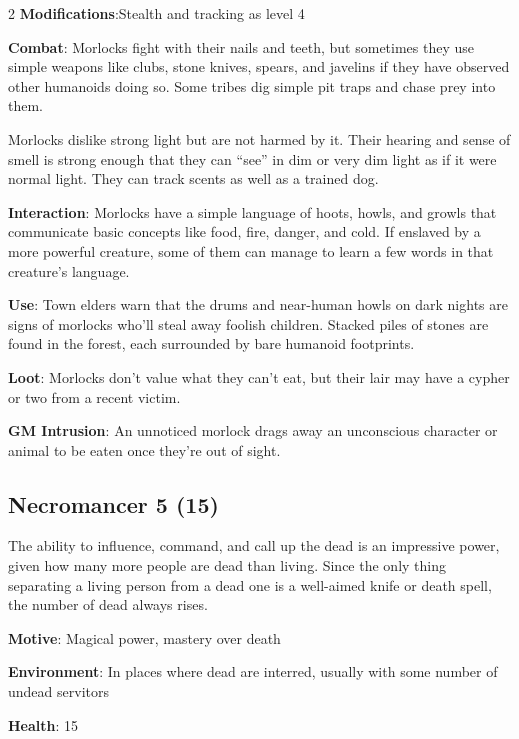 \begin{multicols}{2}
\textbf{Modifications}:Stealth and tracking as level 4 

\textbf{Combat}: Morlocks fight with their nails and teeth, but sometimes they use simple weapons like clubs, stone knives, spears, and javelins if they have observed other humanoids doing so. Some tribes dig simple pit traps and chase prey into them. 

Morlocks dislike strong light but are not harmed by it. Their hearing and sense of smell is strong enough that they can “see” in dim or very dim light as if it were normal light. They can track scents as well as a trained dog. 

\textbf{Interaction}: Morlocks have a simple language of hoots, howls, and growls that communicate basic concepts like food, fire, danger, and cold. If enslaved by a more powerful creature, some of them can manage to learn a few words in that creature’s language. 

\textbf{Use}: Town elders warn that the drums and near-human howls on dark nights are signs of morlocks who’ll steal away foolish children. Stacked piles of stones are found in the forest, each surrounded by bare humanoid footprints. 

\textbf{Loot}: Morlocks don’t value what they can’t eat, but their lair may have a cypher or two from a recent victim.

\textbf{GM Intrusion}: An unnoticed morlock drags away an unconscious character or animal to be eaten once they’re out of sight.

\subsection{Necromancer 5 (15)}

The ability to influence, command, and call up the dead is an impressive power, given how many more people are dead than living. Since the only thing separating a living person from a dead one is a well-aimed knife or death spell, the number of dead always rises. 

\textbf{Motive}: Magical power, mastery over death 

\textbf{Environment}: In places where dead are interred, usually with some number of undead servitors 

\textbf{Health}: 15 


\end{multicols}
